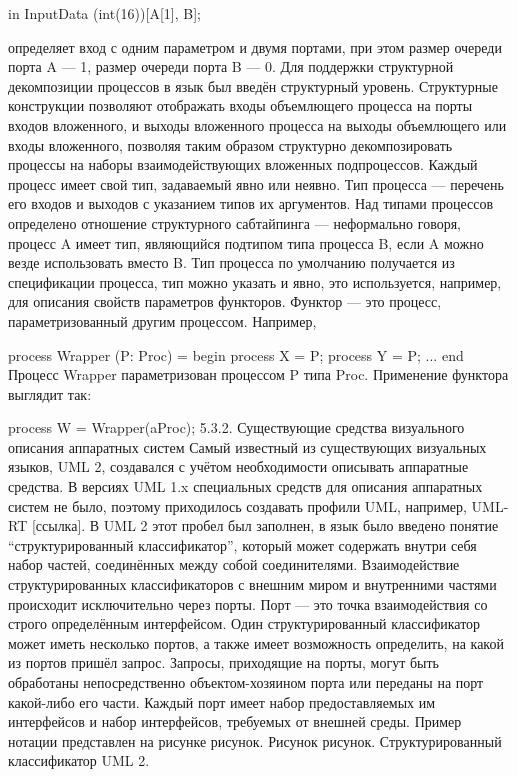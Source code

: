 in InputData (int(16))[A[1], B];

определяет вход с одним параметром и двумя портами, при этом размер очереди порта A --- 1, размер очереди порта B --- 0.
Для поддержки структурной декомпозиции процессов в язык был введён структурный уровень. Структурные конструкции позволяют отображать входы объемлющего процесса на порты входов вложенного, и выходы вложенного процесса на выходы объемлющего или входы вложенного, позволяя таким образом структурно декомпозировать процессы на наборы взаимодействующих вложенных подпроцессов.
Каждый процесс имеет свой тип, задаваемый явно или неявно. Тип процесса --- перечень его входов и выходов с указанием типов их аргументов. Над типами процессов определено отношение структурного сабтайпинга --- неформально говоря, процесс A имеет тип, являющийся подтипом типа процесса B, если A можно везде использовать вместо B. Тип процесса по умолчанию получается из спецификации процесса, тип можно указать и явно, это используется, например, для описания свойств параметров функторов.
Функтор — это процесс, параметризованный другим процессом. Например,

process Wrapper (P: Proc) =
begin
  process X = P;
  process Y = P;
  ...
end
Процесс Wrapper параметризован процессом P типа Proc. Применение функтора выглядит так:

process W = Wrapper(aProc);
5.3.2. Существующие средства визуального описания аппаратных систем
Самый известный из существующих визуальных языков, UML 2, создавался с учётом необходимости описывать аппаратные средства. В версиях UML 1.x специальных средств для описания аппаратных систем не было, поэтому приходилось создавать профили UML, например, UML-RT [ссылка]. В UML 2 этот пробел был заполнен, в язык было введено понятие “структурированный классификатор”, который может содержать внутри себя набор частей, соединённых между собой соединителями. Взаимодействие структурированных классификаторов с внешним миром и внутренними частями происходит исключительно через порты. Порт --- это точка взаимодействия со строго определённым интерфейсом. Один структурированный классификатор может иметь несколько портов, а также имеет возможность определить, на какой из портов пришёл запрос. Запросы, приходящие на порты, могут быть обработаны непосредственно объектом-хозяином порта или переданы на порт какой-либо его части. Каждый порт имеет набор предоставляемых им интерфейсов и набор интерфейсов, требуемых от внешней среды. Пример нотации представлен на рисунке рисунок.
Рисунок рисунок. Структурированный классификатор UML 2.

